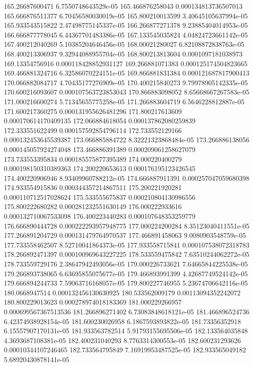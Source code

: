 {165.26687600471 6.7550748643529e-05
165.466876258043 0.000134813736507013
165.666876511377 6.70456580030019e-05
165.800210013599 3.40645105637994e-05
165.933543515822 2.47498775145337e-05
166.266877271378 9.23885404014953e-05
166.666877778045 6.44367701483386e-05
167.133545035824 4.04824723661142e-05
167.400212040269 5.10385204646456e-05
168.00021280027 6.82108872838763e-05
168.400213306937 9.32944088955704e-05
168.800213813604 0.0001097181038973
169.13354756916 0.000118428852931127
169.266881071383 0.000125174504823665
169.466881324716 6.32586070224151e-05
169.866881831384 0.000121687817900413
170.066882084717 4.70435177276909e-05
170.400215840273 9.79978905142335e-05
170.600216093607 0.000107563723853043
170.866883098052 8.65668667267583e-05
171.000216600274 5.71345655775258e-05
171.266883604719 6.5646228812887e-05
171.600217360275 0.000131955626481296
171.800217613609 0.000170614170409135
172.066884618054 0.000137862080259839
172.333551622499 0.000157592854796114
172.733552129166 0.000132453645539387
173.066885884722 8.32221323868484e-05
173.266886138056 0.000145057924274048
173.466886391389 0.000209061258627079
173.733553395834 0.000185575877395389
174.000220400279 0.000198150310389363
174.200220653613 0.000176195123426545
174.400220906946 8.93409960788212e-05
174.666887911391 0.000257047059680398
174.933554915836 0.000344357214867511
175.200221920281 0.000110712517028624
175.533555675837 0.000210804130986556
175.800222680282 0.000281232551630149
176.000222933616 0.000132710067533098
176.400223440283 0.000107648353259779
176.666890444728 0.000222293957948775
177.000224200284 8.35123040411551e-05
177.266891204729 0.000131479764970537
177.466891458063 9.0080903548759e-05
177.733558462507 8.52710041864373e-05
177.933558715841 0.000107538072318783
178.266892471397 0.000100969643227225
178.533559475842 7.63510244062272e-05
178.733559729176 2.38647942493056e-05
179.000226733621 7.64665844225538e-05
179.266893738065 6.63695855075677e-05
179.466893991399 4.42687749524142e-05
179.666894244733 7.59063716168057e-05
179.800227746955 5.23674706642116e-05
180.0668947514 0.000132456130630925
180.533562009179 0.00113094352242072
180.800229013623 0.000278974018183369
181.000229266957 0.000699567367513536
181.266896271402 6.73083848618121e-05
181.466896524736 6.42374938928154e-05
181.600230026958 6.1867593893822e-05
181.73356352918 6.15557907170131e-05
181.933563782514 5.91793155695506e-05
182.133564035848 4.3693687108381e-05
182.400231040293 8.7763314300553e-05
182.600231293626 0.00010344107246465
182.733564795849 7.16919953487525e-05
182.933565049182 5.68920430878141e-05
}
